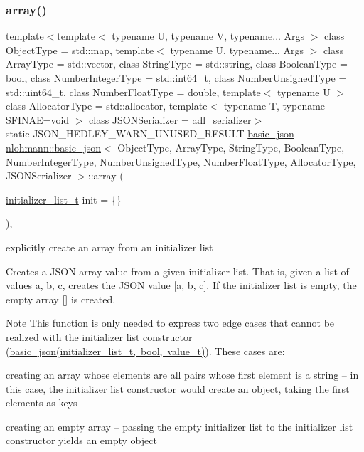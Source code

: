 \subsubsection{\texorpdfstring{array()}{array()}}
{\footnotesize\ttfamily template$<$template$<$ typename U, typename V, typename... Args $>$ class Object\+Type = std\+::map, template$<$ typename U, typename... Args $>$ class Array\+Type = std\+::vector, class String\+Type  = std\+::string, class Boolean\+Type  = bool, class Number\+Integer\+Type  = std\+::int64\+\_\+t, class Number\+Unsigned\+Type  = std\+::uint64\+\_\+t, class Number\+Float\+Type  = double, template$<$ typename U $>$ class Allocator\+Type = std\+::allocator, template$<$ typename T, typename S\+F\+I\+N\+A\+E=void $>$ class J\+S\+O\+N\+Serializer = adl\+\_\+serializer$>$ \\
static J\+S\+O\+N\+\_\+\+H\+E\+D\+L\+E\+Y\+\_\+\+W\+A\+R\+N\+\_\+\+U\+N\+U\+S\+E\+D\+\_\+\+R\+E\+S\+U\+LT \mbox{\hyperlink{classnlohmann_1_1basic__json}{basic\+\_\+json}} \mbox{\hyperlink{classnlohmann_1_1basic__json}{nlohmann\+::basic\+\_\+json}}$<$ Object\+Type, Array\+Type, String\+Type, Boolean\+Type, Number\+Integer\+Type, Number\+Unsigned\+Type, Number\+Float\+Type, Allocator\+Type, J\+S\+O\+N\+Serializer $>$\+::array (\begin{DoxyParamCaption}\item[{\mbox{\hyperlink{classnlohmann_1_1basic__json_ad70a098fbc01c53497db29d3b5b656a9}{initializer\+\_\+list\+\_\+t}}}]{init = {\ttfamily \{\}} }\end{DoxyParamCaption})\hspace{0.3cm}{\ttfamily [inline]}, {\ttfamily [static]}}



explicitly create an array from an initializer list 

Creates a J\+S\+ON array value from a given initializer list. That is, given a list of values {\ttfamily a, b, c}, creates the J\+S\+ON value {\ttfamily \mbox{[}a, b, c\mbox{]}}. If the initializer list is empty, the empty array {\ttfamily \mbox{[}\mbox{]}} is created.

\begin{DoxyNote}{Note}
This function is only needed to express two edge cases that cannot be realized with the initializer list constructor (\mbox{\hyperlink{classnlohmann_1_1basic__json_ab5dfd9a2b2663b219641cb7fe59b6da2}{basic\+\_\+json(initializer\+\_\+list\+\_\+t, bool, value\+\_\+t)}}). These cases are\+:
\begin{DoxyEnumerate}
\item creating an array whose elements are all pairs whose first element is a string -- in this case, the initializer list constructor would create an object, taking the first elements as keys
\item creating an empty array -- passing the empty initializer list to the initializer list constructor yields an empty object
\end{DoxyEnumerate}
\end{DoxyNote}


